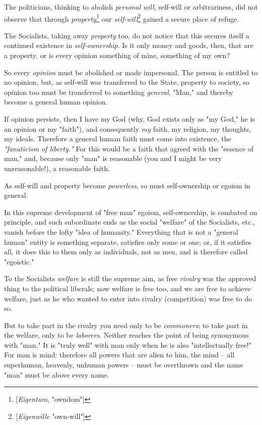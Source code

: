 \documentclass[a4paper]{book}
\begin{document}
The politicians, thinking to abolish \textit{personal will}, self-will or 
arbitrariness, did not observe that through 
\textit{property}\footnote{[\textit{Eigentum}, "{}owndom"{}]} our 
\textit{self-will}\footnote{[\textit{Eigenwille} "{}own-will"{}]} gained a 
secure place of refuge.

The Socialists, taking away \textit{property} too, do not notice that this 
secures itself a continued existence in \textit{self-ownership}. Is it only 
money and goods, then, that are a property. or is every opinion something of 
mine, something of my own?

So every \textit{opinion} must be abolished or made impersonal. The person is 
entitled to no opinion, but, as self-will was transferred to the State, 
property to society, so opinion too must be transferred to something 
\textit{general}, "{}Man,"{} and thereby become a general human opinion.

If opinion persists, then I have my God (why, God exists only as "{}my God,"{} 
he is an opinion or my "{}faith"{}), and consequently \textit{my} faith, my 
religion, my thoughts, my ideals. Therefore a general human faith must come 
into existence, the \textit{"{}fanaticism of liberty."{}} For this would be a 
faith that agreed with the "{}essence of man,"{} and, because only "{}man"{} 
is reasonable (you and I might be very unreasonable!), a reasonable faith.

As self-will and property become \textit{powerless}, so must self-ownership or 
egoism in general.

In this supreme development of "{}free man"{} egoism, self-ownership, is 
combated on principle, and such subordinate ends as the social "{}welfare"{} 
of the Socialists, etc., vanish before the lofty "{}idea of humanity."{} 
Everything that is not a "{}general human"{} entity is something separate, 
satisfies only some or one; or, if it satisfies all, it does this to them only 
as individuals, not as men, and is therefore called "{}egoistic."{}

To the Socialists \textit{welfare} is still the supreme aim, as free 
\textit{rivalry} was the approved thing to the political liberals; now welfare 
is free too, and we are free to achieve welfare, just as he who wanted to 
enter into rivalry (competition) was free to do so.

But to take part in the rivalry you need only to be \textit{commoners}; to 
take part in the welfare, only to be \textit{laborers}. Neither reaches the 
point of being synonymous with "{}man."{} It is "{}truly well"{} with man only 
when he is also "{}intellectually free!"{} For man is mind: therefore all 
powers that are alien to him, the mind -- all superhuman, heavenly, unhuman 
powers -- must be overthrown and the name "{}man"{} must be above every name.
\end{document}

